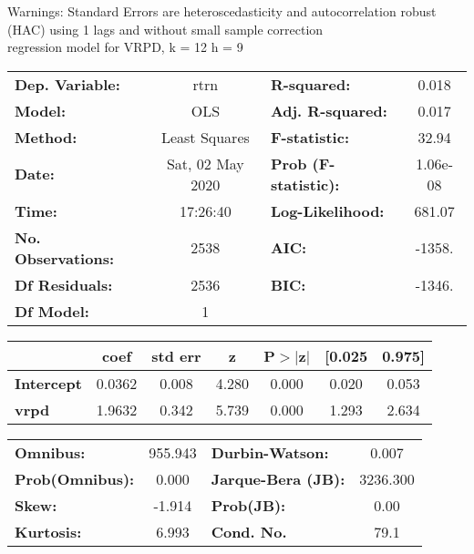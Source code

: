 Warnings: \newline
 [1] Standard Errors are heteroscedasticity and autocorrelation robust (HAC) using 1 lags and without small sample correction\\ 

regression model for VRPD, k = 12 h = 9\begin{center}
\begin{tabular}{lclc}
\toprule
\textbf{Dep. Variable:}    &       rtrn       & \textbf{  R-squared:         } &     0.018   \\
\textbf{Model:}            &       OLS        & \textbf{  Adj. R-squared:    } &     0.017   \\
\textbf{Method:}           &  Least Squares   & \textbf{  F-statistic:       } &     32.94   \\
\textbf{Date:}             & Sat, 02 May 2020 & \textbf{  Prob (F-statistic):} &  1.06e-08   \\
\textbf{Time:}             &     17:26:40     & \textbf{  Log-Likelihood:    } &    681.07   \\
\textbf{No. Observations:} &        2538      & \textbf{  AIC:               } &    -1358.   \\
\textbf{Df Residuals:}     &        2536      & \textbf{  BIC:               } &    -1346.   \\
\textbf{Df Model:}         &           1      & \textbf{                     } &             \\
\bottomrule
\end{tabular}
\begin{tabular}{lcccccc}
                   & \textbf{coef} & \textbf{std err} & \textbf{z} & \textbf{P$> |$z$|$} & \textbf{[0.025} & \textbf{0.975]}  \\
\midrule
\textbf{Intercept} &       0.0362  &        0.008     &     4.280  &         0.000        &        0.020    &        0.053     \\
\textbf{vrpd}      &       1.9632  &        0.342     &     5.739  &         0.000        &        1.293    &        2.634     \\
\bottomrule
\end{tabular}
\begin{tabular}{lclc}
\textbf{Omnibus:}       & 955.943 & \textbf{  Durbin-Watson:     } &    0.007  \\
\textbf{Prob(Omnibus):} &   0.000 & \textbf{  Jarque-Bera (JB):  } & 3236.300  \\
\textbf{Skew:}          &  -1.914 & \textbf{  Prob(JB):          } &     0.00  \\
\textbf{Kurtosis:}      &   6.993 & \textbf{  Cond. No.          } &     79.1  \\
\bottomrule
\end{tabular}
\end{center}

